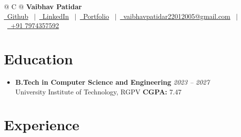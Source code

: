\documentclass[a4paper,11pt]{article}
\begin{document}
\pagestyle{empty}


\begin{tabularx}{\linewidth}{@{} C @{}}
\Huge{\textbf{Vaibhav Patidar}} \\[2pt]
{\small
\href{https://github.com/VaibhavPatidar26}{\raisebox{-0.05\height}\faGithub\ Github}
\ $|$\ 
\href{https://linkedin.com/in/vaibhav-patidar-227338297}{\raisebox{-0.05\height}\faLinkedin\ LinkedIn}
\ $|$\ 
\href{https://portfolio-five-gamma-su3klqtnsx.vercel.app/}{\raisebox{-0.05\height}\faGlobe\ Portfolio}
\ $|$\ 
\href{mailto:vaibhavpatidar22012005@gmail.com}{\raisebox{-0.05\height}\faEnvelope\ vaibhavpatidar22012005@gmail.com}
\ $|$\ 
\href{tel:+917974357592}{\raisebox{-0.05\height}\faMobile*\ +91 7974357592}
}
\end{tabularx}

\section{Education}

\begin{itemize}[leftmargin=1.15em, itemsep=0.5pt, topsep=0.5pt, parsep=0pt, partopsep=0pt]
	\item \textbf{B.Tech in Computer Science and Engineering} \hfill \textit{2023 -- 2027} \\
	      University Institute of Technology, RGPV \hfill \textbf{CGPA:} 7.47
\end{itemize}

\section{Experience}
\end{document}
